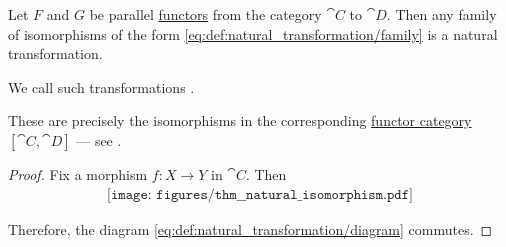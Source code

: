 \begin{proposition}\label{thm:natural_isomorphism}
  Let \( F \) and \( G \) be parallel \hyperref[def:functor]{functors} from the category \( \cat{C} \) to \( \cat{D} \). Then any family of isomorphisms of the form \eqref{eq:def:natural_transformation/family} is a natural transformation.

  We call such transformations .

  These are precisely the isomorphisms in the corresponding \hyperref[def:functor_category]{functor category} \( [\cat{C}, \cat{D}] \) --- see .
\end{proposition}
\begin{proof}
  Fix a morphism \( f: X \to Y \) in \( \cat{C} \). Then
  \begin{equation}\label{eq:thm:natural_isomorphism/diagram}
    \begin{aligned}
      \texttt{[image: figures/thm\_\_natural\_isomorphism.pdf]}
    \end{aligned}
  \end{equation}

  Therefore, the diagram \eqref{eq:def:natural_transformation/diagram} commutes.
\end{proof}

